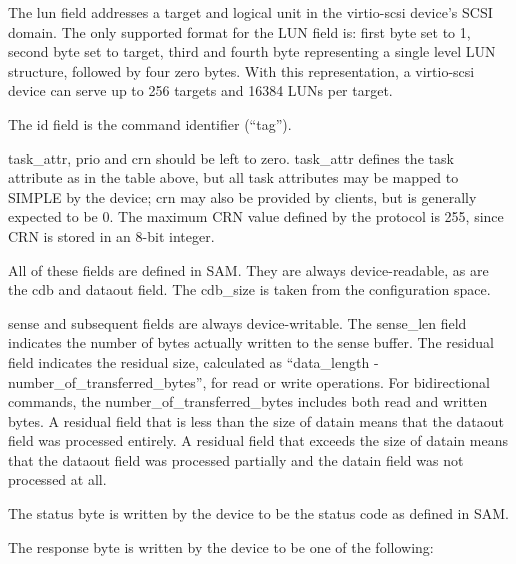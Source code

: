 The lun field addresses a target and logical unit in the
virtio-scsi device's SCSI domain. The only supported format for
the LUN field is: first byte set to 1, second byte set to target,
third and fourth byte representing a single level LUN structure,
followed by four zero bytes. With this representation, a
virtio-scsi device can serve up to 256 targets and 16384 LUNs per
target.

The id field is the command identifier (“tag”).

task_attr, prio and crn should be left to zero. task_attr defines
the task attribute as in the table above, but all task attributes
may be mapped to SIMPLE by the device; crn may also be provided
by clients, but is generally expected to be 0. The maximum CRN
value defined by the protocol is 255, since CRN is stored in an
8-bit integer.

All of these fields are defined in SAM. They are always
device-readable, as are the cdb and dataout field. The cdb_size is
taken from the configuration space.

sense and subsequent fields are always device-writable. The sense_len
field indicates the number of bytes actually written to the sense
buffer. The residual field indicates the residual size,
calculated as “data_length - number_of_transferred_bytes”, for
read or write operations. For bidirectional commands, the
number_of_transferred_bytes includes both read and written bytes.
A residual field that is less than the size of datain means that
the dataout field was processed entirely. A residual field that
exceeds the size of datain means that the dataout field was
processed partially and the datain field was not processed at
all.

The status byte is written by the device to be the status code as
defined in SAM.

The response byte is written by the device to be one of the
following:

